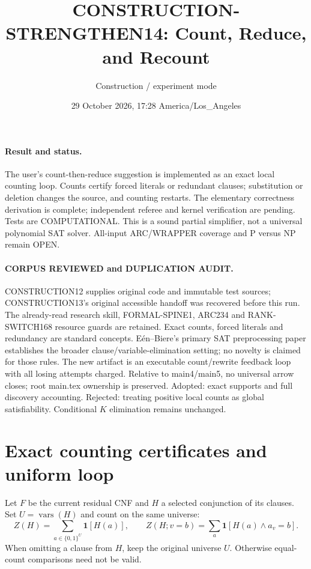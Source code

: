 \documentclass[11pt]{article}
\title{CONSTRUCTION-STRENGTHEN14: Count, Reduce, and Recount}
\author{Construction / experiment mode}
\date{29 October 2026, 17:28 America/Los\_Angeles}
\begin{document}
\sloppy\maketitle
\paragraph{Result and status.}
The user's count-then-reduce suggestion is implemented as an exact local
counting loop. Counts certify forced literals or redundant clauses;
substitution or deletion changes the source, and counting restarts.
The elementary correctness derivation is complete; independent referee
and kernel verification are pending. Tests are COMPUTATIONAL.
This is a sound partial simplifier, not a universal polynomial SAT solver.
All-input ARC/WRAPPER coverage and P versus NP remain OPEN.

\paragraph{CORPUS REVIEWED and DUPLICATION AUDIT.}
CONSTRUCTION12 supplies original code and immutable test sources;
CONSTRUCTION13's original accessible handoff was recovered before this run.
The already-read research skill, FORMAL-SPINE1, ARC234 and RANK-SWITCH168
resource guards are retained. Exact counts, forced literals and redundancy
are standard concepts. E\'en--Biere's primary SAT preprocessing paper
\cite{een} establishes the broader clause/variable-elimination setting;
no novelty is claimed for those rules. The new artifact is an executable
count/rewrite feedback loop with all losing attempts charged.
Relative to main4/main5, no universal arrow closes; root main.tex ownership
is preserved. Adopted: exact supports and full discovery accounting.
Rejected: treating positive local counts as global satisfiability.
Conditional $K$ elimination remains unchanged.

\section{Exact counting certificates and uniform loop}
Let $F$ be the current residual CNF and $H$ a selected conjunction of its
clauses. Set $U=\operatorname{vars}(H)$ and count on the same universe:
\[
 Z(H)=\sum_{a\in\{0,1\}^U}\mathbf1[H(a)],\qquad
 Z(H;v=b)=\sum_a\mathbf1[H(a)\land a_v=b].
\]
When omitting a clause from $H$, keep the original universe $U$.
Otherwise equal-count comparisons need not be valid.
\end{document}
